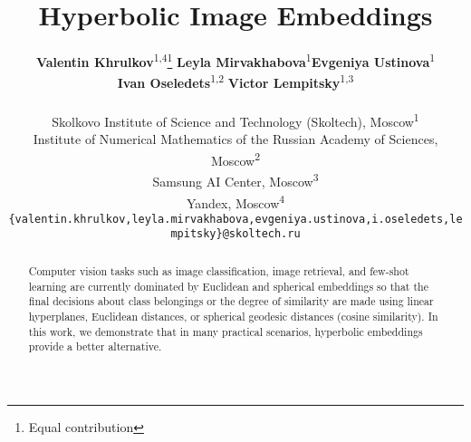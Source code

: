 \documentclass[10pt,twocolumn,letterpaper]{article}
\begin{document}
\title{Hyperbolic Image Embeddings}

\author{\textbf{Valentin Khrulkov}\textsuperscript{1,4}\thanks{Equal contribution} \quad \textbf{Leyla Mirvakhabova}\textsuperscript{1}\footnotemark[1] \quad \textbf{Evgeniya Ustinova}\textsuperscript{1} \\
\textbf{Ivan Oseledets}\textsuperscript{1,2} \quad \textbf{Victor Lempitsky}\textsuperscript{1,3}\\
\\
Skolkovo Institute of Science and Technology (Skoltech), Moscow\textsuperscript{1}\\
Institute of Numerical Mathematics of the
Russian Academy of Sciences, Moscow\textsuperscript{2} \\
Samsung AI Center, Moscow\textsuperscript{3} \\
Yandex, Moscow\textsuperscript{4} \\
{\tt\small \{valentin.khrulkov,leyla.mirvakhabova,evgeniya.ustinova,i.oseledets,lempitsky\}@skoltech.ru}}

\maketitle



\begin{abstract}
Computer vision tasks such as image classification, image retrieval, and few-shot learning are currently dominated by Euclidean and spherical embeddings so that the final decisions about class belongings or the degree of similarity are made using linear hyperplanes, Euclidean distances, or spherical geodesic distances (cosine similarity). In this work, we demonstrate that in many practical scenarios, hyperbolic embeddings provide a better alternative.
\end{abstract}
\end{document}

